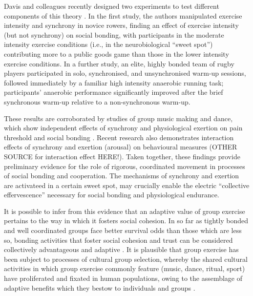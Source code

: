 \begin{CJK}{UTF8}{gbsn}
Davis and colleagues recently designed two experiments to test different components of this theory \citep{Davis2015}.  In the first study, the authors manipulated exercise intensity and synchrony in novice rowers, finding an effect of exercise intensity (but not synchrony) on social bonding, with participants in the moderate intensity exercise conditions (i.e., in the neurobiological ``sweet spot'') contributing more to a public goods game than those in the lower intensity exercise conditions.  In a further study, an elite, highly bonded team of rugby players participated in solo, synchronised, and unsynchronised warm-up sessions, followed immediately by a familiar high intensity anaerobic running task; participants' anaerobic performance significantly improved after the brief synchronous warm-up relative to a non-synchronous warm-up.

These results are corroborated by studies of group music making and dance, which show independent effects of synchrony and physiological exertion on pain threshold and social bonding \cite{Tarr2015}.  Recent research also demonstrates interaction effects of synchrony and exertion (arousal) on behavioural measures \citep{Jackson2018} (OTHER SOURCE for interaction effect HERE!). Taken together, these findings provide preliminary evidence for the role of rigorous, coordinated movement in processes of social bonding and cooperation.  The mechanisms of synchrony and exertion are activateed in a certain sweet spot, may crucially enable the electric ``collective effervescence'' necessary for social bonding and physiological endurance.

It is possible to infer from this evidence that an adaptive value of group exercise pertains to the way in which it fosters social cohesion.  In so far as tightly bonded and well coordinated groups face better survival odds than those which are less so, bonding activities that foster social cohesion and trust can be considered collectively advantageous and adaptive \citep{Dunbar2010}.  It is plausible that group exercise has been subject to processes of cultural group selection, whereby the shared cultural activities in which group exercise commonly feature (music, dance, ritual, sport) have proliferated and fixated in human populations, owing to the assemblage of adaptive benefits which they bestow to individuals and groups \citep{Dunbar2010,Whitehouse2004,Atkinson2011a}.


\end{CJK}
